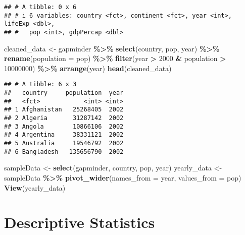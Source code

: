 \documentclass[
]{article}
\newenvironment{Shaded}{\begin{snugshade}}{\end{snugshade}}
\newcommand{\AttributeTok}[1]{\textcolor[rgb]{0.13,0.29,0.53}{#1}}
\newcommand{\DecValTok}[1]{\textcolor[rgb]{0.00,0.00,0.81}{#1}}
\newcommand{\FunctionTok}[1]{\textcolor[rgb]{0.13,0.29,0.53}{\textbf{#1}}}
\newcommand{\NormalTok}[1]{#1}
\newcommand{\OtherTok}[1]{\textcolor[rgb]{0.56,0.35,0.01}{#1}}
\newcommand{\SpecialCharTok}[1]{\textcolor[rgb]{0.81,0.36,0.00}{\textbf{#1}}}
\begin{document}
\begin{verbatim}
## # A tibble: 0 x 6
## # i 6 variables: country <fct>, continent <fct>, year <int>, lifeExp <dbl>,
## #   pop <int>, gdpPercap <dbl>
\end{verbatim}

\begin{Shaded}
\begin{Highlighting}[]
\NormalTok{cleaned\_data }\OtherTok{\textless{}{-}}\NormalTok{ gapminder }\SpecialCharTok{\%\textgreater{}\%} 
  \FunctionTok{select}\NormalTok{(country, pop, year) }\SpecialCharTok{\%\textgreater{}\%} 
  \FunctionTok{rename}\NormalTok{(}\AttributeTok{population =}\NormalTok{ pop) }\SpecialCharTok{\%\textgreater{}\%} 
  \FunctionTok{filter}\NormalTok{(year }\SpecialCharTok{\textgreater{}} \DecValTok{2000} \SpecialCharTok{\&}\NormalTok{ population }\SpecialCharTok{\textgreater{}} \DecValTok{10000000}\NormalTok{) }\SpecialCharTok{\%\textgreater{}\%} 
  \FunctionTok{arrange}\NormalTok{(year)}
\FunctionTok{head}\NormalTok{(cleaned\_data)}
\end{Highlighting}
\end{Shaded}

\begin{verbatim}
## # A tibble: 6 x 3
##   country     population  year
##   <fct>            <int> <int>
## 1 Afghanistan   25268405  2002
## 2 Algeria       31287142  2002
## 3 Angola        10866106  2002
## 4 Argentina     38331121  2002
## 5 Australia     19546792  2002
## 6 Bangladesh   135656790  2002
\end{verbatim}

\begin{Shaded}
\begin{Highlighting}[]
\NormalTok{sampleData }\OtherTok{\textless{}{-}} \FunctionTok{select}\NormalTok{(gapminder, country, pop, year)}
\NormalTok{yearly\_data }\OtherTok{\textless{}{-}}\NormalTok{ sampleData }\SpecialCharTok{\%\textgreater{}\%} 
  \FunctionTok{pivot\_wider}\NormalTok{(}\AttributeTok{names\_from =}\NormalTok{ year, }\AttributeTok{values\_from =}\NormalTok{ pop)}
\FunctionTok{View}\NormalTok{(yearly\_data)}
\end{Highlighting}
\end{Shaded}

\section{Descriptive Statistics}\label{descriptive-statistics}

\begin{Shaded}
\end{Shaded}
\end{document}
